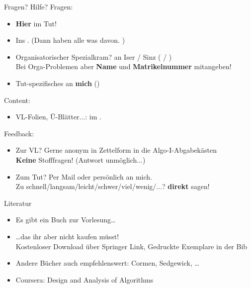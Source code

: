 \begin{frame}{Fragen? Hilfe?}
	Fragen:
	\begin{itemize}
		\item \textbf{Hier} im Tut!
		\item Ins \ILIAS. (Dann haben alle was davon. \smiley) \\
		\pause
		\item Organisatorischer Spezialkram? \impl an  Iser / Sinz  ( /  ) \\
		Bei Orga-Problemen aber \textbf{Name} und \textbf{Matrikelnummer}  mitangeben! \\
		\item Tut-spezifisches an \textbf{mich} (\mailto{\mymail})
	\end{itemize}
	\pause
	Content:
	\begin{itemize}
		\item VL-Folien, Ü-Blätter...: im \ILIAS.
	\end{itemize}
	\pause
	Feedback:
	\begin{itemize}
		\item Zur VL? \impl Gerne anonym in Zettelform in die Algo-I-Abgabekästen \\
		\textbf{Keine} Stofffragen! (Antwort unmöglich...)
		\item Zum Tut? \impl Per Mail oder persönlich an mich. \smiley \\
			Zu schnell/langsam/leicht/schwer/viel/wenig/...? \impl \textbf{direkt} sagen!
	\end{itemize}
\end{frame}

\begin{frame}{Literatur}
	\begin{itemize}
		\item Es gibt ein Buch zur Vorlesung\dots
		\item \dots das ihr aber nicht kaufen müsst! \\
			Kostenloser Download über Springer Link, Gedruckte Exemplare in der Bib
		\item Andere Bücher auch empfehlenswert: Cormen, Sedgewick, \dots
		\item Coursera: Design and Analysis of Algorithms
	\end{itemize}

\end{frame}

